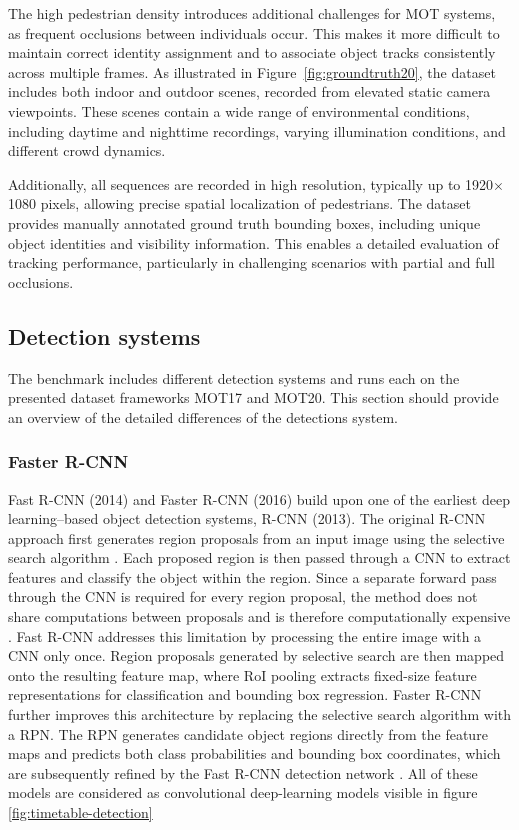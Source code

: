 The high pedestrian density introduces additional challenges for MOT systems, as frequent occlusions between individuals occur. This makes it more difficult to maintain correct identity assignment and to associate object tracks consistently across multiple frames. As illustrated in Figure~\ref{fig:groundtruth20}, the dataset includes both indoor and outdoor scenes, recorded from elevated static camera viewpoints. These scenes contain a wide range of environmental conditions, including daytime and nighttime recordings, varying illumination conditions, and different crowd dynamics.

Additionally, all sequences are recorded in high resolution, typically up to 1920$\times$1080 pixels, allowing precise spatial localization of pedestrians. The dataset provides manually annotated ground truth bounding boxes, including unique object identities and visibility information. This enables a detailed evaluation of tracking performance, particularly in challenging scenarios with partial and full occlusions.

\subsection{Detection systems}

The benchmark includes different detection systems and runs each on the presented dataset frameworks
MOT17 and MOT20. This section should provide an overview of the detailed differences of the 
detections system. 

\subsubsection{Faster R-CNN}
Fast \ac{R-CNN} (2014) \cite{fast-r-cnn} and Faster R-CNN (2016) \cite{faster-r-cnn} build upon one of the earliest deep learning–based object detection systems, R-CNN \cite{r-cnn} (2013).  
The original R-CNN approach first generates region proposals from an input image using the selective search algorithm \cite{felzenszwalb}. Each proposed region is then passed through a CNN to extract features and classify the object within the region. Since a separate forward pass through the CNN is required for every region proposal, the method does not share computations between proposals and is therefore computationally expensive \cite{fast-r-cnn}.
Fast R-CNN addresses this limitation by processing the entire image with a CNN only once. Region proposals generated by selective search are then mapped onto the resulting feature map, where \ac{RoI} pooling extracts fixed-size feature representations for classification and bounding box regression.
Faster R-CNN further improves this architecture by replacing the selective search algorithm with a \ac{RPN}. The RPN generates candidate object regions directly from the feature maps and predicts both class probabilities and bounding box coordinates, which are subsequently refined by the Fast R-CNN detection network \cite{faster-r-cnn}.
All of these models are considered as convolutional deep-learning models visible in figure \ref{fig:timetable-detection}

